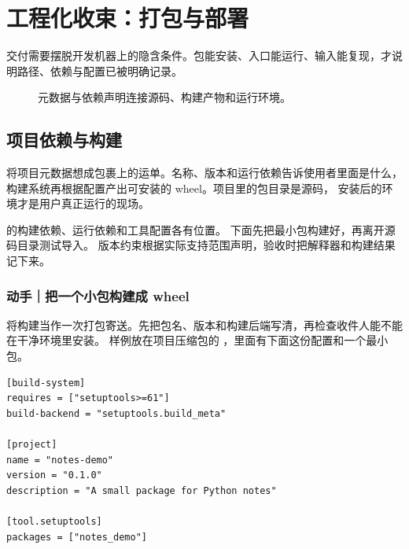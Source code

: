 \chapter{工程化收束：打包与部署}
\label{ch:17-outline}

交付需要摆脱开发机器上的隐含条件。包能安装、入口能运行、输入能复现，才说明路径、依赖与配置已被明确记录。


\begin{figure}[htbp]
  \centering
  \caption*{元数据与依赖声明连接源码、构建产物和运行环境。}
\end{figure}


\section{项目依赖与构建}

将项目元数据想成包裹上的运单。名称、版本和运行依赖告诉使用者里面是什么，
构建系统再根据配置产出可安装的 wheel。项目里的包目录是源码，
安装后的环境才是用户真正运行的现场。

 的构建依赖、运行依赖和工具配置各有位置。
下面先把最小包构建好，再离开源码目录测试导入。
版本约束根据实际支持范围声明，验收时把解释器和构建结果记下来。

\subsection*{动手｜把一个小包构建成 wheel}

将构建当作一次打包寄送。先把包名、版本和构建后端写清，再检查收件人能不能在干净环境里安装。
样例放在项目压缩包的 ，里面有下面这份配置和一个最小包。

\begin{lstlisting}[language={},title={\code{pyproject.toml}}]
[build-system]
requires = ["setuptools>=61"]
build-backend = "setuptools.build_meta"

[project]
name = "notes-demo"
version = "0.1.0"
description = "A small package for Python notes"

[tool.setuptools]
packages = ["notes_demo"]
\end{lstlisting}

